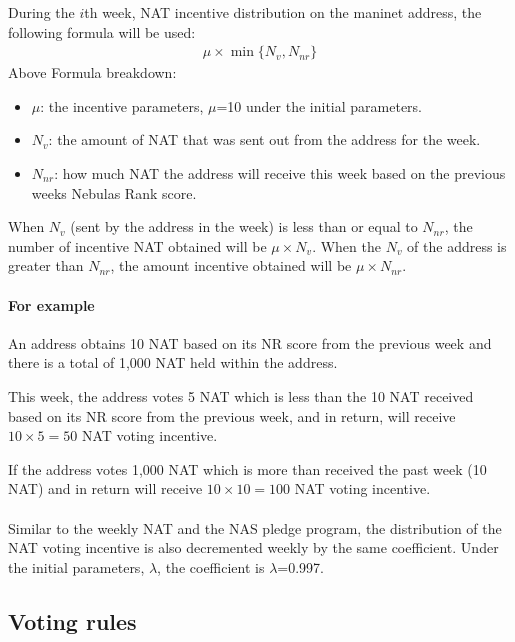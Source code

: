 During the $i$th week, NAT incentive distribution on the maninet address, the following formula will be used:
\begin{align}
\mu \times \min \{N_{v}, N_{nr}\}
\end{align}
Above Formula breakdown:

\begin{itemize}
	\item $\mu$: the incentive parameters, $\mu$=10 under the initial parameters.
	\item $N_{v}$: the amount of NAT that was sent out from the address for the week.
	\item $N_{nr}$: how much NAT the address will receive this week based on the previous weeks Nebulas Rank score.
\end{itemize}
\noindent When $N_{v}$ (sent by the address in the week) is less than or equal
to $N_{nr}$, the number of incentive NAT obtained will be $\mu\times N_v$. When the $N_{v}$ of the address is greater than $N_{nr}$, the amount incentive obtained will be $\mu\times N_{nr}$.

\paragraph{For example}

An address obtains 10 NAT based on its NR score from the previous week and there is a total of 1,000 NAT held within the address.

This week, the address votes 5 NAT which is less than the 10 NAT received based on its NR score from the previous week, and in return, will receive $10\times5=50$ NAT voting incentive.

If the address votes 1,000 NAT which is more than received the past week (10 NAT) and in return will receive $10\times10=100$ NAT voting incentive.

\paragraph{}
Similar to the weekly NAT and the NAS pledge program, the distribution of the NAT voting incentive is also decremented weekly by the same coefficient. Under the initial parameters, $\lambda$, the coefficient is $\lambda$=0.997.

\subsection{Voting rules}

